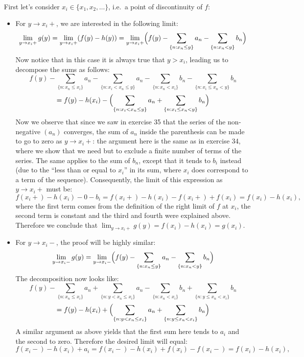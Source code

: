 \begin{solution}
    First let's consider $x_i \in \{x_1, x_2, \ldots\}$, i.e.\ a point of discontinuity of $f$:
    \begin{itemize}
        \item For $y \rightarrow x_i+$, we are interested in the following limit:
        $$\lim_{y \rightarrow x_i+} g(y) = \lim_{y \rightarrow x_i+} (f(y) - h(y)) = \lim_{y \rightarrow x_i+} \Bigl(f(y) - \sum_{\{n: x_n \leq y\}} a_n - \sum_{\{n: x_n < y\}}b_n\Bigr)$$
        Now notice that in this case it is always true that $y > x_i$, leading us to decompose the sums as follows:
        $$f(y) - \sum_{\{n: x_n \leq x_i\}}a_n - \sum_{\{n: x_i < x_n \leq y\}} a_n - \sum_{\{n: x_n < x_i\}} b_n - \sum_{\{n: x_i \leq x_n < y\}} b_n$$
        $$ = f(y) - h(x_i) - \Bigl(\sum_{\{n: x_i < x_n \leq y\}} a_n + \sum_{\{n: x_i \leq x_n < y\}} b_n\Bigr)$$
        Now we observe that since we saw in exercise 35 that the series of the non-negative $(a_n)$ converges, the sum of $a_n$ inside the parenthesis can be made to go to zero as $y \rightarrow x_i+$: the argument here is the same as in exercise 34, where we show that we need but to exclude a finite number of terms of the series.
        The same applies to the sum of $b_n$, except that it tends to $b_i$ instead (due to the ``less than or equal to $x_i$'' in its sum, where $x_i$ does correspond to a term of the sequence).
        Consequently, the limit of this expression as $y \rightarrow x_i+$ must be:
        $$f(x_i+) - h(x_i) - 0 - b_i = f(x_i+) - h(x_i) - f(x_i+) + f(x_i) = f(x_i) - h(x_i),$$
        where the first term comes from the definition of the right limit of $f$ at $x_i$, the second term is constant and the third and fourth were explained above.
        Therefore we conclude that $\lim_{y \rightarrow x_i+} g(y) = f(x_i) - h(x_i) = g(x_i)$.
        \item For $y \rightarrow x_i-$, the proof will be highly similar:
        $$\lim_{y \rightarrow x_i-} g(y) = \lim_{y \rightarrow x_i-} \Bigl( f(y) - \sum_{\{n: x_n \leq y\}} a_n - \sum_{\{n: x_n < y\}} b_n \Bigr)$$
        The decomposition now looks like:
        $$f(y) - \sum_{\{n: x_n \leq x_i\}}a_n + \sum_{\{n: y < x_n \leq x_i\}} a_n - \sum_{\{n: x_n < x_i\}} b_n + \sum_{\{n: y \leq x_n < x_i\}} b_n$$
        $$ = f(y) - h(x_i) + \Bigl(\sum_{\{n: y < x_n \leq x_i\}} a_n + \sum_{\{n: y \leq x_n < x_i\}} b_n\Bigr)$$
        A similar argument as above yields that the first sum here tends to $a_i$ and the second to zero.
        Therefore the desired limit will equal:
        $$f(x_i-) - h(x_i) + a_i = f(x_i-) - h(x_i) + f(x_i) - f(x_i-) = f(x_i) - h(x_i),$$

\end{itemize}
\end{solution}
